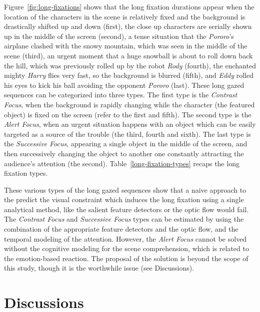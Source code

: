 \documentclass[10pt,letterpaper]{article}
\begin{document}
Figure~\ref{fig:long-fixations} shows that the long fixation durations appear when the location of the characters in the scene is relatively fixed and the background is drastically shifted up and down (first), the close up characters are serially shown up in the middle of the screen (second), a tense situation that the \textit{Pororo}'s airplane clashed with the snowy mountain, which was seen in the middle of the scene (third), an urgent moment that a huge snowball is about to roll down back the hill, which was previously rolled up by the robot \textit{Rody} (fourth), the enchanted mighty \textit{Harry} flies very fast, so the background is blurred (fifth), and \textit{Eddy} rolled his eyes to kick his ball avoiding the opponent \textit{Pororo} (last). These long gazed sequences can be categorized into three types. The first type is the \textit{Contrast Focus}, when the background is rapidly changing while the character (the featured object) is fixed on the screen (refer to the first and fifth). The second type is the \textit{Alert Focus}, when an urgent situation happens with an object which can be easily targeted as a source of the trouble (the third, fourth and sixth). The last type is the \textit{Successive Focus}, appearing a single object in the middle of the screen, and then successively changing the object to another one constantly attracting the audience's attention (the second). Table~\ref{long-fixation-types} recaps the long fixation types.

These various types of the long gazed sequences show that a naive approach to the predict the visual constraint which induces the long fixation using a single analytical method, like the salient feature detectors \cite{marr1980,canny1986} or the optic flow \cite{koenderink1986} would fail. The \textit{Contrast Focus} and \textit{Successive Focus} types can be estimated by using the combination of the appropriate feature detectors and the optic flow, and the temporal modeling of the attention. However, the \textit{Alert Focus} cannot be solved without the cognitive modeling for the scene comprehension, which is related to the emotion-based reaction. The proposal of the solution is beyond the scope of this study, though it is the worthwhile issue (see Discussions).


\section{Discussions}
\end{document}
